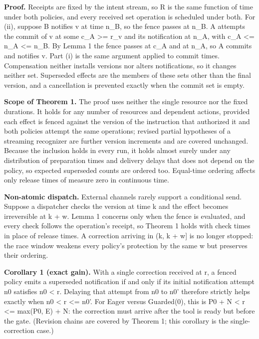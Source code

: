 \documentclass[review,12pt]{elsarticle}
\begin{document}
\textbf{Proof.} Receipts are fixed by the intent stream, so R is the same function of time under both policies, and every received set operation is scheduled under both. For (ii), suppose B notifies v at time n\_\allowbreak{}B, so the fence passes at n\_\allowbreak{}B. A attempts the commit of v at some c\_\allowbreak{}A >= r\_\allowbreak{}v and its notification at n\_\allowbreak{}A, with c\_\allowbreak{}A <= n\_\allowbreak{}A <= n\_\allowbreak{}B. By Lemma 1 the fence passes at c\_\allowbreak{}A and at n\_\allowbreak{}A, so A commits and notifies v. Part (i) is the same argument applied to commit times. Compensation neither installs versions nor alters notifications, so it changes neither set. Superseded effects are the members of these sets other than the final version, and a cancellation is prevented exactly when the commit set is empty.


\textbf{Scope of Theorem 1.} The proof uses neither the single resource nor the fixed durations. It holds for any number of resources and dependent actions, provided each effect is fenced against the version of the instruction that authorized it and both policies attempt the same operations; revised partial hypotheses of a streaming recognizer are further version increments and are covered unchanged. Because the inclusion holds in every run, it holds almost surely under any distribution of preparation times and delivery delays that does not depend on the policy, so expected superseded counts are ordered too. Equal-time ordering affects only release times of measure zero in continuous time.


\textbf{Non-atomic dispatch.} External channels rarely support a conditional send. Suppose a dispatcher checks the version at time k and the effect becomes irreversible at k + w. Lemma 1 concerns only when the fence is evaluated, and every check follows the operation's receipt, so Theorem 1 holds with check times in place of release times. A correction arriving in (k, k + w] is no longer stopped: the race window weakens every policy's protection by the same w but preserves their ordering.


\textbf{Corollary 1 (exact gain).} With a single correction received at r, a fenced policy emits a superseded notification if and only if its initial notification attempt n0 satisfies n0 < r. Delaying that attempt from n0 to n0' therefore strictly helps exactly when n0 < r <= n0'. For Eager versus Guarded(0), this is P0 + N < r <= max(P0, E) + N: the correction must arrive after the tool is ready but before the gate. (Revision chains are covered by Theorem 1; this corollary is the single-correction case.)
\end{document}
